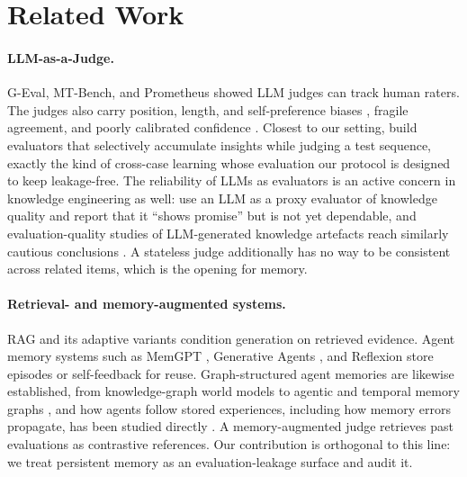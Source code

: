\documentclass[]{ceurart}
\begin{document}
\section{Related Work}

\paragraph{LLM-as-a-Judge.} G-Eval, MT-Bench, and Prometheus \citep{geval2023, mt_bench2023, prometheus2023} showed LLM judges can track human raters. The judges also carry position, length, and self-preference biases \citep{llm_judge_bias2024, position_bias2024}, fragile agreement, and poorly calibrated confidence \citep{chateval2023, llm_judge_agreement2024, judge_calibration2024}. Closest to our setting, \citet{jwa2026experienced} build evaluators that selectively accumulate insights while judging a test sequence, exactly the kind of cross-case learning whose evaluation our protocol is designed to keep leakage-free. The reliability of LLMs as evaluators is an active concern in knowledge engineering as well: \citet{hannah2025knowledge} use an LLM as a proxy evaluator of knowledge quality and report that it ``shows promise'' but is not yet dependable, and evaluation-quality studies of LLM-generated knowledge artefacts reach similarly cautious conclusions \citep{llugiqi2025experts, fathallah2024llms4life}. A stateless judge additionally has no way to be consistent across related items, which is the opening for memory.

\paragraph{Retrieval- and memory-augmented systems.} RAG \citep{rag_original2020} and its adaptive variants \citep{active_rag2023, self_rag2023} condition generation on retrieved evidence. Agent memory systems such as MemGPT \citep{memgpt2023}, Generative Agents \citep{generative_agents2023}, and Reflexion \citep{reflexion2023} store episodes or self-feedback for reuse. Graph-structured agent memories are likewise established, from knowledge-graph world models to agentic and temporal memory graphs \citep{anokhin2025arigraph, xu2025amem, rasmussen2025zep}, and how agents follow stored experiences, including how memory errors propagate, has been studied directly \citep{xiong2026memory}. A memory-augmented judge retrieves past evaluations as contrastive references. Our contribution is orthogonal to this line: we treat persistent memory as an evaluation-leakage surface and audit it.
\end{document}
